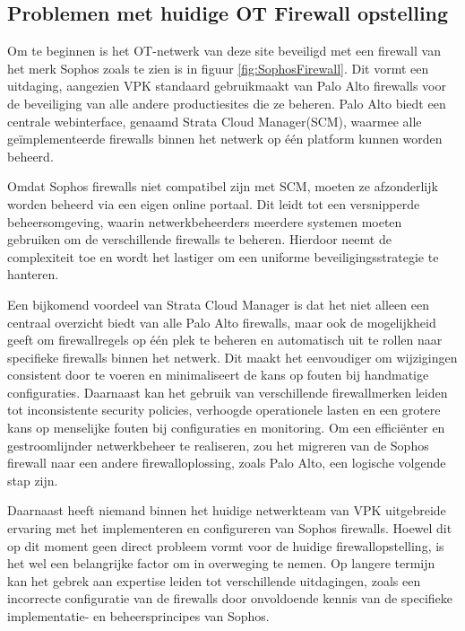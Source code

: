 \subsection{Problemen met huidige OT Firewall opstelling}
Om te beginnen is het OT-netwerk van deze site beveiligd met een firewall van het merk Sophos zoals te zien is in figuur \ref{fig:SophosFirewall}. Dit vormt een uitdaging, aangezien VPK standaard gebruikmaakt van Palo Alto firewalls voor de beveiliging van alle andere productiesites die ze beheren. Palo Alto biedt een centrale webinterface, genaamd Strata Cloud Manager(SCM), waarmee alle geïmplementeerde firewalls binnen het netwerk op één platform kunnen worden beheerd.

\vspace{5mm}
Omdat Sophos firewalls niet compatibel zijn met SCM, moeten ze afzonderlijk worden beheerd via een eigen online portaal. Dit leidt tot een versnipperde beheersomgeving, waarin netwerkbeheerders meerdere systemen moeten gebruiken om de verschillende firewalls te beheren. Hierdoor neemt de complexiteit toe en wordt het lastiger om een uniforme beveiligingsstrategie te hanteren.

\vspace{5mm}
Een bijkomend voordeel van Strata Cloud Manager is dat het niet alleen een centraal overzicht biedt van alle Palo Alto firewalls, maar ook de mogelijkheid geeft om firewallregels op één plek te beheren en automatisch uit te rollen naar specifieke firewalls binnen het netwerk. Dit maakt het eenvoudiger om wijzigingen consistent door te voeren en minimaliseert de kans op fouten bij handmatige configuraties.
Daarnaast kan het gebruik van verschillende firewallmerken leiden tot inconsistente security policies, verhoogde operationele lasten en een grotere kans op menselijke fouten bij configuraties en monitoring. Om een efficiënter en gestroomlijnder netwerkbeheer te realiseren, zou het migreren van de Sophos firewall naar een andere firewalloplossing, zoals Palo Alto, een logische volgende stap zijn.

\vspace{5mm}
Daarnaast heeft niemand binnen het huidige netwerkteam van VPK uitgebreide ervaring met het implementeren en configureren van Sophos firewalls. Hoewel dit op dit moment geen direct probleem vormt voor de huidige firewallopstelling, is het wel een belangrijke factor om in overweging te nemen. Op langere termijn kan het gebrek aan expertise leiden tot verschillende uitdagingen, zoals een incorrecte configuratie van de firewalls door onvoldoende kennis van de specifieke implementatie- en beheersprincipes van Sophos.

